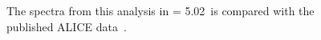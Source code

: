 \documentclass[ALICE,manyauthors]{ALICE_internal_notes}
\begin{document}
\begin{figure}[p]
  \caption{The spectra from this analysis in \ppb \s = 5.02\tev\  is compared with the published ALICE data~\cite{Abelev:2014dsa}.}
  \label{fig:spectra_LHC13}
\end{figure}
\end{document}
